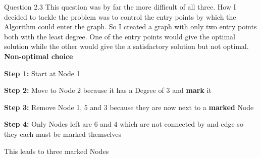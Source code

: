 \documentclass[10pt]{article}
\begin{document}
\pagebreak
\hfill \break
\break
Question 2.3
\hfill \break
\break
This question was by far the more difficult of all three. How I decided to tackle the problem was to control the entry points by which the Algorithm could enter the graph. So I created a graph with only two entry points both with the least degree. One of the entry points would give the optimal solution while the other would give the a satisfactory solution but not optimal.
\hfill \break
\break
\textbf{Non-optimal choice}
\begin{steps}
  \item \textbf{Step 1:} Start at Node 1
  \item \textbf{Step 2:} Move to Node 2 because it has a Degree of 3 and \textbf{mark} it
  \item \textbf{Step 3:} Remove Node 1, 5 and 3 because they are now next to a \textbf{marked} Node
  \item \textbf{Step 4:} Only Nodes left are 6 and 4 which are not connected by and edge so they each must be marked themselves
\end{steps}
\hfill \break
\break
This leads to three marked Nodes
\begin{center}

\end{center}
\noindent{}%
\hfill%
\end{document}
